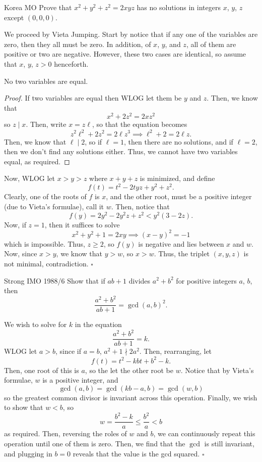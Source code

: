 \documentclass{article}
\begin{document}
\begin{problem}[4.7.1]{Korea MO}
Prove that $x^2+y^2+z^2 = 2xyz$ has no solutions in integers $x$, $y$, $z$ except $(0, 0, 0)$.
\end{problem}

We proceed by Vieta Jumping. Start by notice that if any one of the variables are zero, then they all must be zero. In addition, of $x$, $y$, and $z$, all of them are positive or two are negative. However, these two cases are identical, so assume that $x$, $y$, $z > 0$ henceforth.

\begin{claim*}
No two variables are equal.
\end{claim*}
\begin{proof}
If two variables are equal then WLOG let them be $y$ and $z$. Then, we know that \[x^2+2z^2 = 2xz^2\] so $z \mid x$. Then, write $x = z\ell$, so that the equation becomes \[z^2\ell^2 + 2z^2 = 2\ell z^3 \implies \ell^2+2 = 2\ell z.\] Then, we know that $\ell \mid 2$, so if $\ell = 1$, then there are no solutions, and if $\ell = 2$, then we don't find any solutions either. Thus, we cannot have two variables equal, as required.
\end{proof}

Now, WLOG let $x > y > z$ where $x+y+z$ is minimized, and define \[f(t) = t^2-2tyz+y^2+z^2.\] Clearly, one of the roots of $f$ is $x$, and the other root, must be a positive integer (due to Vieta's formulae), call it $w$. Then, notice that \[f(y) = 2y^2-2y^2z+z^2 < y^2(3-2z).\] Now, if $z = 1$, then it suffices to solve \[x^2+y^2+1 = 2xy \implies (x-y)^2 = -1\] which is impossible. Thus, $z \ge 2$, so $f(y)$ is negative and lies between $x$ and $w$. Now, since $x > y$, we know that $y > w$, so $x > w$. Thus, the triplet $(x, y, z)$ is not minimal, contradiction. $\square$

\begin{problem}[4.7.2]{Strong IMO 1988/6}
Show that if $ab + 1$ divides $a^2 + b^2$ for positive integers $a$, $b$, then \[\dfrac{a^2+b^2}{ab+1} = \gcd(a, b)^2.\]
\end{problem}

We wish to solve for $k$ in the equation \[\dfrac{a^2+b^2}{ab+1} = k.\] WLOG let $a > b$, since if $a = b$, $a^2 + 1\nmid 2a^2$. Then, rearranging, let \[f(t) = t^2-kbt+b^2-k.\] Then, one root of this is $a$, so the let the other root be $w$. Notice that by Vieta's formulae, $w$ is a positive integer, and \[\gcd(a, b) = \gcd(kb-a, b) = \gcd(w, b)\] so the greatest common divisor is invariant across this operation. Finally, we wish to show that $w < b$, so \[w = \dfrac{b^2-k}{a} \le \dfrac{b^2}{a} < b\] as required. Then, reversing the roles of $w$ and $b$, we can continuously repeat this operation until one of them is zero. Then, we find that the $\gcd$ is still invariant, and plugging in $b = 0$ reveals that the value is the gcd squared. $\square$ 
\end{document}
